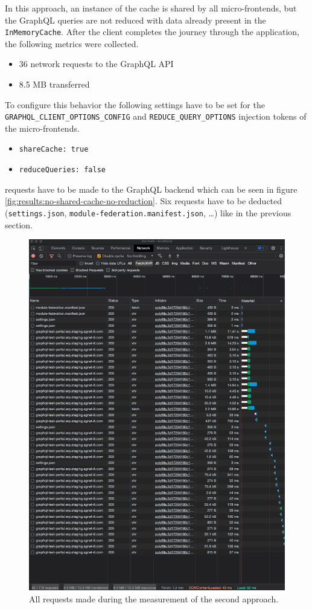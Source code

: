 In this approach, an instance of the cache is shared by all micro-frontends, but the GraphQL queries are not reduced with data already present in the \texttt{InMemoryCache}. After the client completes the journey through the application, the following metrics were collected.

\begin{itemize}
  \item 36 network requests to the GraphQL \ac{API}
  \item 8.5 MB transferred
\end{itemize}

\noindent To configure this behavior the following settings have to be set for the \texttt{GRAPHQL\_CLIENT\_OPTIONS\_CONFIG} and \texttt{REDUCE\_QUERY\_OPTIONS} injection tokens of the micro-frontends.

\begin{itemize}
  \item \texttt{shareCache: true}
  \item \texttt{reduceQueries: false}
\end{itemize}

 requests have to be made to the GraphQL backend which can be seen in figure \ref{fig:results:no-shared-cache-no-reduction}. Six requests have to be deducted (\texttt{settings.json}, \texttt{module-federation.manifest.json}, \dots) like in the previous section.

\ifshowImages
\begin{figure}[H]
\centering
\includegraphics[width=0.6\linewidth]{images/results/1-attempt/shared-not-reduced-cache.png}
\caption{All requests made during the measurement of the second approach.}\label{fig:results:shared-cache-no-reduction}
\end{figure}
\fi

